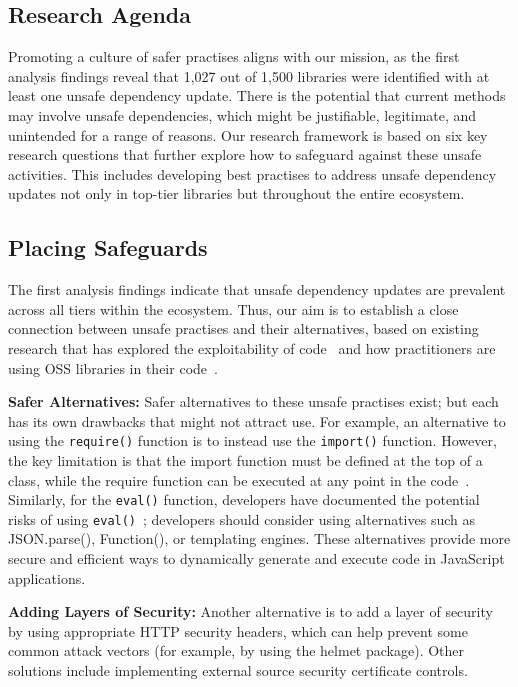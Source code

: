\documentclass[sigconf,screen]{acmart}
\begin{document}
\begin{sloppy}
\section{Research Agenda}

Promoting a culture of safer practises aligns with our mission, as the first analysis findings reveal that 1,027 out of 1,500 libraries were identified with at least one unsafe dependency update. There is the potential that current methods may involve unsafe dependencies, which might be justifiable, legitimate, and unintended for a range of reasons. 
Our research framework is based on six key research questions that further explore how to safeguard against these unsafe activities. This includes developing best practises to address unsafe dependency updates not only in top-tier libraries but throughout the entire ecosystem.

\subsection{Placing Safeguards}
The first analysis findings indicate that unsafe dependency updates are prevalent across all tiers within the ecosystem. Thus, our aim is to establish a close connection between unsafe practises and their alternatives, based on existing research that has explored the exploitability of code~\citep{kang:issta2022} and how practitioners are using OSS libraries in their code~\citep{cispa3932}.


\textbf{Safer Alternatives:} Safer alternatives to these unsafe practises exist; but each has its own drawbacks that might not attract use. For example, an alternative to using the \texttt{require()} function is to instead use the \texttt{import()} function.
However, the key limitation is that the import function must be defined at the top of a class, while the require function can be executed at any point in the code~\citep{JavaScri86:online}. 
Similarly, for the \texttt{eval()} function, developers have documented the potential risks of using \texttt{eval()}~\citep{JavaScri60:online}; developers should consider using alternatives such as JSON.parse(), Function(), or templating engines. These alternatives provide more secure and efficient ways to dynamically generate and execute code in JavaScript applications.

\textbf{Adding Layers of Security:}
Another alternative is to add a layer of security by using appropriate HTTP security headers, which can help prevent some common attack vectors (for example, by using the helmet package).
Other solutions include implementing external source security certificate controls.


\end{sloppy}
\end{document}
